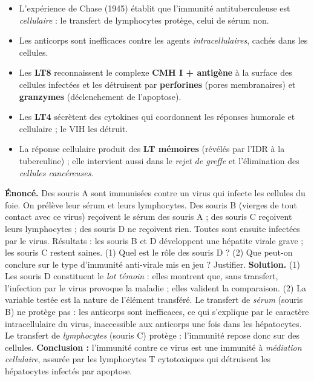 \documentclass[11pt]{article}
\begin{document}
\begin{aretenir}
\begin{itemize}
\item L'expérience de Chase (1945) établit que l'immunité antituberculeuse est \emph{cellulaire} : le transfert de lymphocytes protège, celui de sérum non.
\item Les anticorps sont inefficaces contre les agents \emph{intracellulaires}, cachés dans les cellules.
\item Les \textbf{LT8} reconnaissent le complexe \textbf{CMH I + antigène} à la surface des cellules infectées et les détruisent par \textbf{perforines} (pores membranaires) et \textbf{granzymes} (déclenchement de l'apoptose).
\item Les \textbf{LT4} sécrètent des cytokines qui coordonnent les réponses humorale et cellulaire ; le VIH les détruit.
\item La réponse cellulaire produit des \textbf{LT mémoires} (révélés par l'IDR à la tuberculine) ; elle intervient aussi dans le \emph{rejet de greffe} et l'élimination des \emph{cellules cancéreuses}.
\end{itemize}
\end{aretenir}

\begin{exoresolu}
\textbf{Énoncé.} Des souris A sont immunisées contre un virus qui infecte les cellules du foie. On prélève leur sérum et leurs lymphocytes. Des souris B (vierges de tout contact avec ce virus) reçoivent le sérum des souris A ; des souris C reçoivent leurs lymphocytes ; des souris D ne reçoivent rien. Toutes sont ensuite infectées par le virus. Résultats : les souris B et D développent une hépatite virale grave ; les souris C restent saines. (1) Quel est le rôle des souris D ? (2) Que peut-on conclure sur le type d'immunité anti-virale mis en jeu ? Justifier.
\tcblower
\textbf{Solution.} (1) Les souris D constituent le \emph{lot témoin} : elles montrent que, sans transfert, l'infection par le virus provoque la maladie ; elles valident la comparaison. (2) La variable testée est la nature de l'élément transféré. Le transfert de \emph{sérum} (souris B) ne protège pas : les anticorps sont inefficaces, ce qui s'explique par le caractère intracellulaire du virus, inaccessible aux anticorps une fois dans les hépatocytes. Le transfert de \emph{lymphocytes} (souris C) protège : l'immunité repose donc sur des cellules. \textbf{Conclusion :} l'immunité contre ce virus est une immunité à \emph{médiation cellulaire}, assurée par les lymphocytes T cytotoxiques qui détruisent les hépatocytes infectés par apoptose.
\end{exoresolu}
\end{document}
